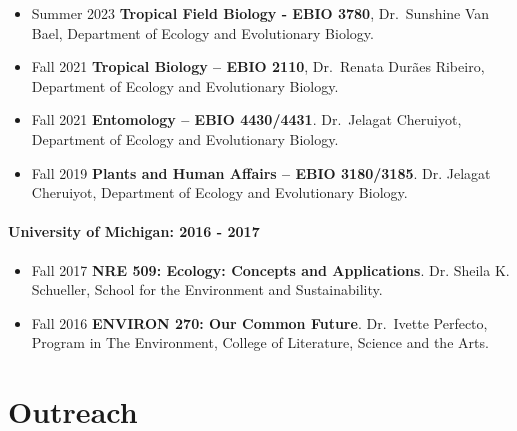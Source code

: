 \documentclass[11pt,a4paper,]{awesome-cv}
\begin{document}
\begin{itemize}
\item
  Summer 2023 \textbar{} \textbf{Tropical Field Biology - EBIO 3780},
  Dr.~Sunshine Van Bael, Department of Ecology and Evolutionary Biology.
\item
  Fall 2021 \textbar{} \textbf{Tropical Biology -- EBIO 2110},
  Dr.~Renata Durães Ribeiro, Department of Ecology and Evolutionary
  Biology.
\item
  Fall 2021 \textbar{} \textbf{Entomology -- EBIO 4430/4431}.
  Dr.~Jelagat Cheruiyot, Department of Ecology and Evolutionary Biology.
\item
  Fall 2019 \textbar{} \textbf{Plants and Human Affairs -- EBIO
  3180/3185}. Dr. Jelagat Cheruiyot, Department of Ecology and
  Evolutionary Biology.
\end{itemize}

\paragraph{University of Michigan: 2016 -
2017}\label{university-of-michigan-2016---2017}

\begin{itemize}
\item
  Fall 2017 \textbar{} \textbf{NRE 509: Ecology: Concepts and
  Applications}. Dr. Sheila K. Schueller, School for the Environment and
  Sustainability.
\item
  Fall 2016 \textbar{} \textbf{ENVIRON 270: Our Common Future}.
  Dr.~Ivette Perfecto, Program in The Environment, College of
  Literature, Science and the Arts.\\
\end{itemize}

\section{\texorpdfstring{
Outreach}{ Outreach}}\label{outreach}

\begin{cventries}
\end{cventries}
\end{document}
